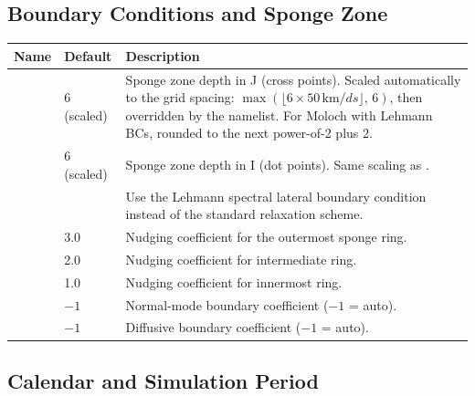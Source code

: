 \subsection{Boundary Conditions and Sponge Zone}
\label{subsec:dynparam_bdy}

\begin{longtable}{L{4.5cm} L{3cm} L{6.5cm}}
  \toprule
  \textbf{Name} & \textbf{Default} & \textbf{Description} \\
  \midrule
  \endhead
  \bottomrule
  \endfoot
              & 6 (scaled) &
    Sponge zone depth in J (cross points). Scaled automatically to the grid
    spacing: $\max(\lfloor 6 \times 50\,\text{km}/ds \rfloor,\,6)$, then
    overridden by the  namelist. For Moloch with Lehmann
    BCs, rounded to the next power-of-2 plus 2. \\
              & 6 (scaled) &
    Sponge zone depth in I (dot points). Same scaling as . \\
  &  &
    Use the Lehmann spectral lateral boundary condition instead of the
    standard relaxation scheme. \\
        & 3.0  & Nudging coefficient for the outermost sponge ring. \\
      & 2.0  & Nudging coefficient for intermediate ring. \\
         & 1.0  & Nudging coefficient for innermost ring. \\
            & $-1$ & Normal-mode boundary coefficient ($-1$ = auto). \\
            & $-1$ & Diffusive boundary coefficient ($-1$ = auto). \\
\end{longtable}

\subsection{Calendar and Simulation Period}
\label{subsec:dynparam_calendar}

